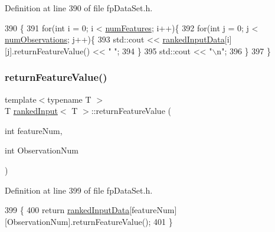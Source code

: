 Definition at line 390 of file fp\+Data\+Set.\+h.


\begin{DoxyCode}
390                                  \{
391             \textcolor{keywordflow}{for}(\textcolor{keywordtype}{int} i = 0; i < \hyperlink{classrankedInput_ad86e2ad8f4044697450ddfdb15aa10a9}{numFeatures}; i++)\{
392                 \textcolor{keywordflow}{for}(\textcolor{keywordtype}{int} j = 0; j < \hyperlink{classrankedInput_a7b0e6ebcf6fa2fcd0b08918e3b3020be}{numObservations}; j++)\{
393                     std::cout << \hyperlink{classrankedInput_a5450364c3f258e15f28248a8a3c93ffa}{rankedInputData}[i][j].returnFeatureValue() << \textcolor{stringliteral}{" "};
394                 \}
395                 std::cout << \textcolor{stringliteral}{"\(\backslash\)n"};
396             \}
397         \}
\end{DoxyCode}
\mbox{\label{classrankedInput_a691f0acc7f92a6e8051e85e585556f06}} 
\subsubsection{\texorpdfstring{return\+Feature\+Value()}{returnFeatureValue()}}
{\footnotesize\ttfamily template$<$typename T $>$ \\
T \hyperlink{classrankedInput}{ranked\+Input}$<$ T $>$\+::return\+Feature\+Value (\begin{DoxyParamCaption}\item[{int}]{feature\+Num,  }\item[{int}]{Observation\+Num }\end{DoxyParamCaption})\hspace{0.3cm}{\ttfamily [inline]}}



Definition at line 399 of file fp\+Data\+Set.\+h.


\begin{DoxyCode}
399                                                                        \{
400             \textcolor{keywordflow}{return} \hyperlink{classrankedInput_a5450364c3f258e15f28248a8a3c93ffa}{rankedInputData}[featureNum][ObservationNum].returnFeatureValue(); 
401         \}
\end{DoxyCode}
\mbox{\label{classrankedInput_a2386d6816fca791a04f13fe2312307be}} 
